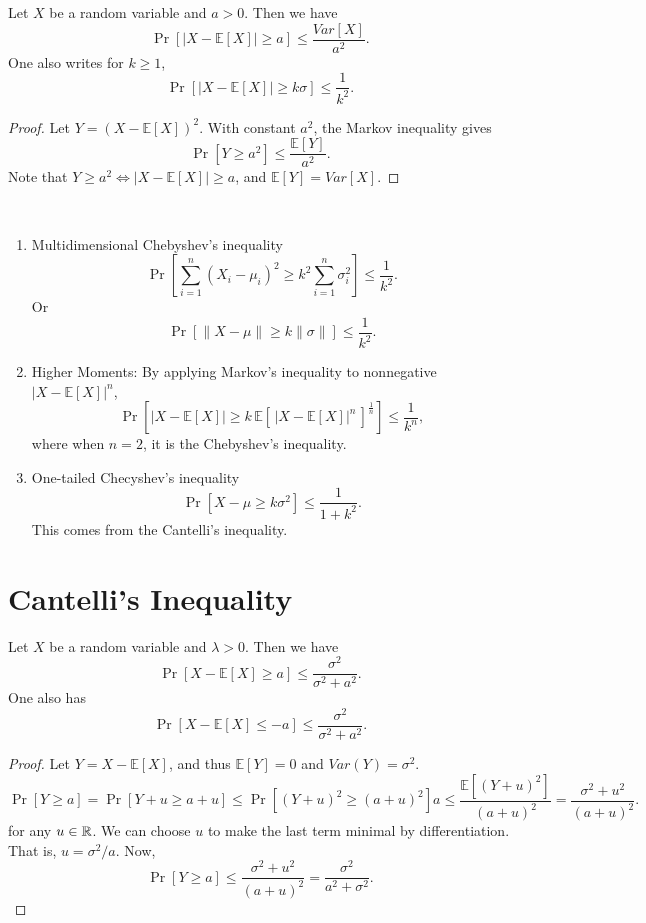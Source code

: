 Let $X$ be a random variable and $a>0$. Then we have
\[
	\Pr[|X - \mathbb{E}[X]| \geq a] \leq \frac{Var[X]}{a^2}.
\]
One also writes for $k \geq 1$,
\[
	\Pr[|X - \mathbb{E}[X]| \geq k\sigma] \leq \frac{1}{k^2}.
\]

\begin{proof}

Let $Y = (X - \mathbb{E}[X])^2$. With constant $a^2$, the Markov inequality gives
\[
	\Pr[Y \geq a^2] \leq \frac{\mathbb{E}[Y]}{a^2}.
\]
Note that $Y \geq a^2 \Leftrightarrow |X - \mathbb{E}[X]| \geq a$, and $\mathbb{E}[Y] = Var[X]$.

\end{proof}


\begin{corollary}
\mbox{}
\\
\begin{enumerate}
\def\labelenumi{\arabic{enumi}.}
	\item Multidimensional Chebyshev's inequality
	\[
	   \Pr \left[ \sum_{i=1}^n (X_i - \mu_i)^2 \geq k^2 \sum_{i=1}^n \sigma_i^2 \right] \leq \frac{1}{k^2}.
	\]
	Or
	\[
	   \Pr[\| X - \mu \| \geq k \|\sigma\|] \leq \frac{1}{k^2}.
	\]

	\item Higher Moments: By applying Markov's inequality to nonnegative $|X-\mathbb{E}[X]|^n$,
	\[
		\Pr\left[ |X - \mathbb{E}[X] | \geq k\, \mathbb{E}[\, |X - \mathbb{E}[X]|^n\,]^\frac{1}{n} \right] \leq \frac{1}{k^n},
	\]
	where when $n=2$, it is the Chebyshev's inequality.

	\item One-tailed Checyshev's inequality
	\[
	   \Pr[X - \mu \geq k\sigma^2] \leq \frac{1}{1+k^2}.
	\]
	This comes from the Cantelli's inequality.
\end{enumerate}
\end{corollary}

\section{Cantelli's Inequality}
\label{sec:cantelli}

Let $X$ be a random variable and $\lambda > 0$. Then we have
\[
	\Pr[X - \mathbb{E}[X] \geq a] \leq \frac{\sigma^2}{\sigma^2 + a^2}.
\]
One also has
\[
	\Pr[X - \mathbb{E}[X] \leq -a] \leq \frac{\sigma^2}{\sigma^2 + a^2}.
\]

\begin{proof}

Let $Y = X - \mathbb{E}[X]$, and thus $\mathbb{E}[Y] = 0$ and $Var(Y) = \sigma^2$.
\[
	\Pr[Y \geq a] = \Pr[Y+u \geq a+u] \leq \Pr[(Y +u)^2 \geq (a+u)^2] a\leq \frac{\mathbb{E}[(Y+u)^2]}{(a+u)^2} = \frac{\sigma^2 + u^2}{(a+u)^2}.
\]
for any $u \in \mathbb{R}$. We can choose $u$ to make the last term minimal by differentiation. That is, $u = \sigma^2/a$. Now,
\[
	\Pr[Y \geq a] \leq \frac{\sigma^2 + u^2}{(a+u)^2} = \frac{\sigma^2}{a^2 + \sigma^2}.
\]
\end{proof}

